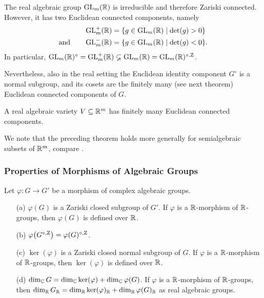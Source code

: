 \begin{example}\label{ex:ZariskiVsEuclideanIdComponent}
	The real algebraic group $\operatorname{GL}_m(\mathbb R)$ is irreducible and therefore Zariski connected. However, it has two Euclidean connected components, namely
		\begin{align*}
			\operatorname{GL}^+_m(\mathbb R) &= \{ g \in \operatorname{GL}_m(\mathbb R) \mid \det(g) > 0 \} \\ 
			\text{and} \qquad	\operatorname{GL}^-_m(\mathbb R) &= \{ g \in \operatorname{GL}_m(\mathbb R) \mid \det(g) < 0 \}.
		\end{align*}
	In particular, $\operatorname{GL}_m(\mathbb R)^{\circ} = \operatorname{GL}^+_m(\mathbb R) \varsubsetneq \operatorname{GL}_m(\mathbb R) = \operatorname{GL}_m(\mathbb R)^{\circ, \operatorname{Z}}$.
	\hfill\exSymbol
\end{example}

Nevertheless, also in the real setting the Euclidean identity component $G^\circ$ is a normal subgroup, and its cosets are the finitely many (see next theorem) Euclidean connected components of $G$.

\begin{theorem} \label{thm:Whitney}
	A real algebraic variety $V \subseteq \mathbb R^m$ has finitely many Euclidean connected components.
\end{theorem}

We note that the preceding theorem holds more generally for semialgebraic subsets of $\mathbb R^m$, compare \cite[Theorem~2.4.5]{BochnakCosteRoy}.



\subsubsection{Properties of Morphisms of Algebraic Groups}


\begin{prop}\label{prop:ZClosedAlgebraicImage}
	Let $\varphi \colon G \to G'$ be a morphism of complex algebraic groups.
	\begin{itemize}
		\item[(a)] $\varphi(G)$ is a Zariski closed subgroup of $G'$. If $\varphi$ is a $\mathbb R$-morphism of $\mathbb R$-groups, then $\varphi(G)$ is defined over $\mathbb R$.
		
		\item[(b)] $\varphi \big( G^{\circ,\operatorname{Z}} \big) = \varphi(G)^{\circ,\operatorname{Z}}$.
		
		\item[(c)] $\ker(\varphi)$ is a Zariski closed normal subgroup of $G$. If $\varphi$ is a $\mathbb R$-morphism of $\mathbb R$-groups, then $\ker(\varphi)$ is defined over $\mathbb R$. 
		
		\item[(d)] $\dim_\mathbb C G = \dim_\mathbb C \ker(\varphi) + \dim_\mathbb C \varphi(G)$. If $\varphi$ is a $\mathbb R$-morphism of $\mathbb R$-groups, then $\dim_\mathbb R G_\mathbb R = \dim_\mathbb R \ker(\varphi)_\mathbb R + \dim_\mathbb R \varphi(G)_\mathbb R$ as real algebraic groups.
	\end{itemize}
\end{prop}

